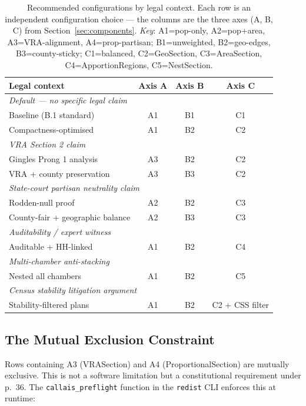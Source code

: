 \begin{table}[h]
\centering
\caption{Recommended configurations by legal context.
  Each row is an independent configuration choice --- the columns are the
  three axes (A, B, C) from Section~\ref{sec:components}.
  \textit{Key}: A1=pop-only, A2=pop+area, A3=VRA-alignment, A4=prop-partisan;
  B1=unweighted, B2=geo-edges, B3=county-sticky;
  C1=balanced, C2=GeoSection, C3=AreaSection, C4=ApportionRegions, C5=NestSection.}
\label{tab:configurations}
\begin{tabular}{p{4.5cm}ccc}
\toprule
\textbf{Legal context} & \textbf{Axis A} & \textbf{Axis B} & \textbf{Axis C} \\
\midrule
\multicolumn{4}{l}{\textit{Default --- no specific legal claim}} \\
Baseline (B.1 standard) & A1 & B1 & C1 \\
Compactness-optimised & A1 & B2 & C2 \\[0.5em]
\multicolumn{4}{l}{\textit{VRA Section 2 claim}} \\
Gingles Prong 1 analysis & A3 & B2 & C2 \\
VRA + county preservation & A3 & B3 & C2 \\[0.5em]
\multicolumn{4}{l}{\textit{State-court partisan neutrality claim}} \\
Rodden-null proof & A2 & B2 & C3 \\
County-fair + geographic balance & A2 & B3 & C3 \\[0.5em]
\multicolumn{4}{l}{\textit{Auditability / expert witness}} \\
Auditable + HH-linked & A1 & B2 & C4 \\[0.5em]
\multicolumn{4}{l}{\textit{Multi-chamber anti-stacking}} \\
Nested all chambers & A1 & B2 & C5 \\[0.5em]
\multicolumn{4}{l}{\textit{Census stability litigation argument}} \\
Stability-filtered plans & A1 & B2 & C2 $+$ CSS filter \\
\bottomrule
\end{tabular}
\end{table}

\subsection{The Mutual Exclusion Constraint}

Rows containing A3 (VRASection) and A4 (ProportionalSection) are mutually
exclusive.
This is not a software limitation but a constitutional requirement under
\callais{} p.~36.
The \texttt{callais\_preflight} function in the \texttt{redist} CLI enforces
this at runtime:

